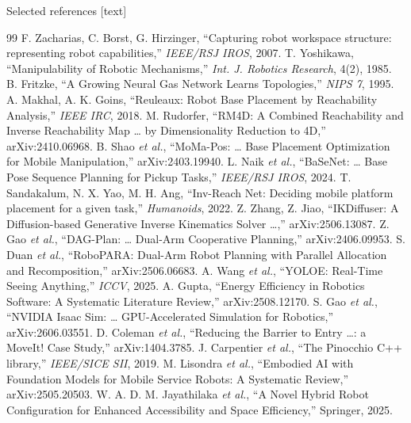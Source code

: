 \documentclass[aspectratio=169]{beamer}
\begin{document}
\begin{frame}[allowframebreaks]{Selected references}
  \scriptsize
  [text]
  \begin{thebibliography}{99}
     F. Zacharias, C. Borst, G. Hirzinger,
      ``Capturing robot workspace structure: representing robot capabilities,''
      \emph{IEEE/RSJ IROS}, 2007.
     T. Yoshikawa, ``Manipulability of Robotic Mechanisms,''
      \emph{Int. J. Robotics Research}, 4(2), 1985.
     B. Fritzke, ``A Growing Neural Gas Network Learns
      Topologies,'' \emph{NIPS 7}, 1995.
     A. Makhal, A. K. Goins, ``Reuleaux: Robot Base Placement
      by Reachability Analysis,'' \emph{IEEE IRC}, 2018.
     M. Rudorfer, ``RM4D: A Combined Reachability and Inverse
      Reachability Map \ldots{} by Dimensionality Reduction to 4D,'' arXiv:2410.06968.
     B. Shao \emph{et al.}, ``MoMa-Pos: \ldots{} Base Placement
      Optimization for Mobile Manipulation,'' arXiv:2403.19940.
     L. Naik \emph{et al.}, ``BaSeNet: \ldots{} Base Pose
      Sequence Planning for Pickup Tasks,'' \emph{IEEE/RSJ IROS}, 2024.
     T. Sandakalum, N. X. Yao, M. H. Ang, ``Inv-Reach Net:
      Deciding mobile platform placement for a given task,'' \emph{Humanoids}, 2022.
     Z. Zhang, Z. Jiao, ``IKDiffuser: A Diffusion-based
      Generative Inverse Kinematics Solver \ldots,'' arXiv:2506.13087.
     Z. Gao \emph{et al.}, ``DAG-Plan: \ldots{} Dual-Arm
      Cooperative Planning,'' arXiv:2406.09953.
     S. Duan \emph{et al.}, ``RoboPARA: Dual-Arm Robot
      Planning with Parallel Allocation and Recomposition,'' arXiv:2506.06683.
     A. Wang \emph{et al.}, ``YOLOE: Real-Time Seeing Anything,''
      \emph{ICCV}, 2025.
     A. Gupta, ``Energy Efficiency in Robotics Software:
      A Systematic Literature Review,'' arXiv:2508.12170.
     S. Gao \emph{et al.}, ``NVIDIA Isaac Sim: \ldots{}
      GPU-Accelerated Simulation for Robotics,'' arXiv:2606.03551.
     D. Coleman \emph{et al.}, ``Reducing the Barrier to Entry
      \ldots{}: a MoveIt! Case Study,'' arXiv:1404.3785.
     J. Carpentier \emph{et al.}, ``The Pinocchio C++
      library,'' \emph{IEEE/SICE SII}, 2019.
     M. Lisondra \emph{et al.}, ``Embodied AI with Foundation
      Models for Mobile Service Robots: A Systematic Review,'' arXiv:2505.20503.
     W. A. D. M. Jayathilaka \emph{et al.}, ``A Novel Hybrid
      Robot Configuration for Enhanced Accessibility and Space Efficiency,''
      Springer, 2025.
  \end{thebibliography}
\end{frame}
\end{document}
